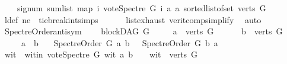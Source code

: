 \begin{isabellebody}
\ \ \ \ {\isacharparenleft}{\kern0pt}signum\ {\isacharparenleft}{\kern0pt}sum{\isacharunderscore}{\kern0pt}list\ {\isacharparenleft}{\kern0pt}map\ {\isacharparenleft}{\kern0pt}{\isasymlambda}i{\isachardot}{\kern0pt}\ vote{\isacharunderscore}{\kern0pt}Spectre\ G\ i\ a\ a{\isacharparenright}{\kern0pt}\ {\isacharparenleft}{\kern0pt}sorted{\isacharunderscore}{\kern0pt}list{\isacharunderscore}{\kern0pt}of{\isacharunderscore}{\kern0pt}set\ {\isacharparenleft}{\kern0pt}verts\ G{\isacharparenright}{\kern0pt}{\isacharparenright}{\kern0pt}{\isacharparenright}{\kern0pt}{\isacharparenright}{\kern0pt}{\isacharparenright}{\kern0pt}\ {\isacharequal}{\kern0pt}\ {}{\isachardoublequoteclose}\isanewline
\ \ \ \ \isamarkupfalse%
\ l{\isacharunderscore}{\kern0pt}def\ ne\ \ tie{\isacharunderscore}{\kern0pt}break{\isacharunderscore}{\kern0pt}int{\isachardot}{\kern0pt}simps\isanewline
\ \ \ \ \ \ list{\isachardot}{\kern0pt}exhaust\ verit{\isacharunderscore}{\kern0pt}comp{\isacharunderscore}{\kern0pt}simplify{}{\isacharparenleft}{\kern0pt}{}{\isacharparenright}{\kern0pt}\ \isamarkupfalse%
\ auto\isanewline
{}\isamarkupfalse%
%
\endisatagproof
{\isafoldproof}%
%
\isadelimproof
\isanewline
%
\endisadelimproof
\isanewline
\isanewline
{}\isamarkupfalse%
\ Spectre{\isacharunderscore}{\kern0pt}Order{\isacharunderscore}{\kern0pt}antisym{\isacharcolon}{\kern0pt}\ \isanewline
\ \ \ {\isachardoublequoteopen}blockDAG\ G{\isachardoublequoteclose}\isanewline
\ \ \ \ \ {\isachardoublequoteopen}a\ {\isasymin}\ verts\ G{\isachardoublequoteclose}\ \isanewline
\ \ \ \ \ {\isachardoublequoteopen}b\ {\isasymin}\ verts\ G{\isachardoublequoteclose}\ \isanewline
\ \ \ \ \ {\isachardoublequoteopen}a\ {\isasymnoteq}\ b{\isachardoublequoteclose}\isanewline
\ \ \ {\isachardoublequoteopen}Spectre{\isacharunderscore}{\kern0pt}Order\ G\ a\ b\ {\isacharequal}{\kern0pt}\ {\isacharparenleft}{\kern0pt}{\isasymnot}\ {\isacharparenleft}{\kern0pt}Spectre{\isacharunderscore}{\kern0pt}Order\ G\ b\ a{\isacharparenright}{\kern0pt}{\isacharparenright}{\kern0pt}{\isachardoublequoteclose}\isanewline
%
\isadelimproof
%
\endisadelimproof
%
\isatagproof
{}\isamarkupfalse%
\ {\isacharminus}{\kern0pt}\isanewline
\ \ \isamarkupfalse%
\ wit\ \ wit{\isacharunderscore}{\kern0pt}in{\isacharcolon}{\kern0pt}\ {\isachardoublequoteopen}vote{\isacharunderscore}{\kern0pt}Spectre\ G\ wit\ a\ b\ {\isasymnoteq}\ {}\ {\isasymand}\ wit\ {\isasymin}\ verts\ G{\isachardoublequoteclose}\ \isanewline

\end{isabellebody}
